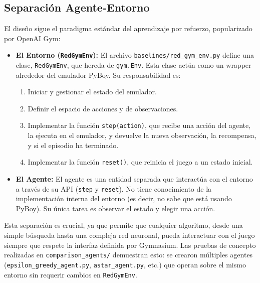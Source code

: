 \documentclass[12pt, oneside, openany]{book}
\begin{document}
\subsection{Separación Agente-Entorno}
El diseño sigue el paradigma estándar del aprendizaje por refuerzo, popularizado por OpenAI Gym:
\begin{itemize}
    \item \textbf{El Entorno (\texttt{RedGymEnv}):} El archivo \texttt{baselines/red\_gym\_env.py} define una clase, \texttt{RedGymEnv}, que hereda de \texttt{gym.Env}. Esta clase actúa como un wrapper alrededor del emulador PyBoy. Su responsabilidad es:
    \begin{enumerate}
        \item Iniciar y gestionar el estado del emulador.
        \item Definir el espacio de acciones y de observaciones.
        \item Implementar la función \texttt{step(action)}, que recibe una acción del agente, la ejecuta en el emulador, y devuelve la nueva observación, la recompensa, y si el episodio ha terminado.
        \item Implementar la función \texttt{reset()}, que reinicia el juego a un estado inicial.
    \end{enumerate}
    \item \textbf{El Agente:} El agente es una entidad separada que interactúa con el entorno a través de su API (\texttt{step} y \texttt{reset}). No tiene conocimiento de la implementación interna del entorno (es decir, no sabe que está usando PyBoy). Su única tarea es observar el estado y elegir una acción.
\end{itemize}

Esta separación es crucial, ya que permite que cualquier algoritmo, desde una simple búsqueda hasta una compleja red neuronal, pueda interactuar con el juego siempre que respete la interfaz definida por Gymnasium. Las pruebas de concepto realizadas en \texttt{comparison\_agents/} demuestran esto: se crearon múltiples agentes (\texttt{epsilon\_greedy\_agent.py}, \texttt{astar\_agent.py}, etc.) que operan sobre el mismo entorno sin requerir cambios en \texttt{RedGymEnv}.
\end{document}
